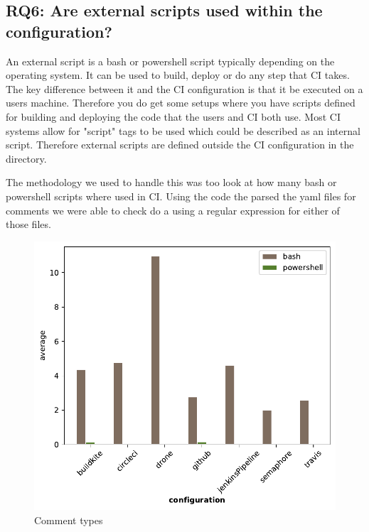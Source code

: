 \documentclass[twoside,12pt,titlepage,a4paper]{article}
\begin{document}
\pagebreak
\vspace*{-0.05in}
\subsection{\textbf{RQ6}: Are external scripts used within the configuration?}
\label{section:RQ6}
\vspace*{-0.05in}

An external script is a bash or powershell script typically depending on the operating system. It can be used to build, deploy or do any step that CI takes. The key difference between it and the CI configuration is that it be executed on a users machine. Therefore you do get some setups where you have scripts defined for building and deploying the code that the users and CI both use. Most CI systems allow for "script" tags to be used which could be described as an internal script. Therefore external scripts are defined outside the CI configuration in the directory.

The methodology we used to handle this was too look at how many bash or powershell scripts where used in CI. Using the code the parsed the yaml files for comments we were able to check do a using a regular expression for either of those files.  


\begin{figure}[!ht]
  \centering
  \begin{minipage}[!t]{.48\textwidth}
      \includegraphics[width=\textwidth]{../src/results/scripts usage bars.pdf}
      \caption[alt text]{Comment types}
      \label{fig:script_usage}  
  \end{minipage}%
  \hfill
  \begin{minipage}[!t]{.48\textwidth}
    
  \end{minipage}
\end{figure}
\end{document}
